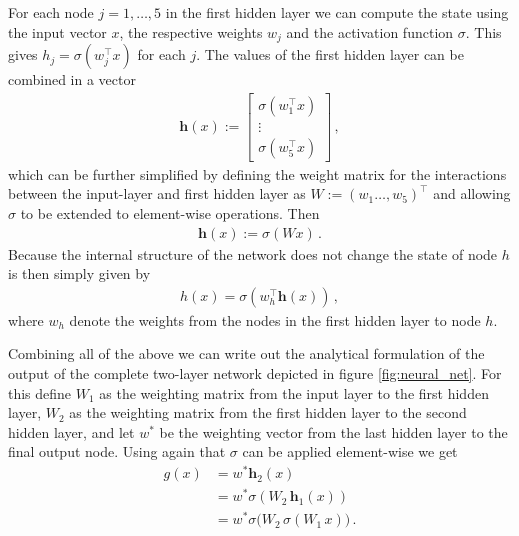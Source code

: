 For each node $j=1,\dots,5$ in the first hidden layer we can compute the state using the
input vector $x$, the respective weights $w_j$ and the activation function $\sigma$.
This gives $h_j = \sigma(w_j^\top x)$ for each $j$. The values of the first hidden layer
can be combined in a vector
\begin{align*}
    \mathbf{h}(x) :=
        \begin{bmatrix}
            \sigma(w_1^\top x)\\
            \vdots\\
            \sigma(w_5^\top x)
        \end{bmatrix} \,,
\end{align*}
which can be further simplified by defining the weight matrix for the interactions
between the input-layer and first hidden layer as $W := (w_1 \dots, w_5)^\top$ and
allowing $\sigma$ to be extended to element-wise operations. Then
\begin{align*}
    \mathbf{h}(x) := \sigma(W x) \,.
\end{align*}
Because the internal structure of the network does not change the state of node $h$ is
then simply given by
\begin{align*}
    h(x) = \sigma(w_h^\top \mathbf{h}(x)) \,,
\end{align*}
where $w_h$ denote the weights from the nodes in the first hidden layer to node $h$.

Combining all of the above we can write out the analytical formulation of the output of
the complete two-layer network depicted in figure \ref{fig:neural_net}. For this define
$W_1$ as the weighting matrix from the input layer to the first hidden layer, $W_2$ as
the weighting matrix from the first hidden layer to the second hidden layer, and let
$w^*$ be the weighting vector from the last hidden layer to the final output node.
Using again that $\sigma$ can be applied element-wise we get
\begin{align*}
    g(x) &= w^* \mathbf{h}_2(x)\\
         &= w^* \sigma(W_2 \, \mathbf{h}_1(x))\\
         &= w^* \sigma \big( W_2 \, \sigma(W_1 \, x) \big) \,.\tag{Neural Network}
\end{align*}

